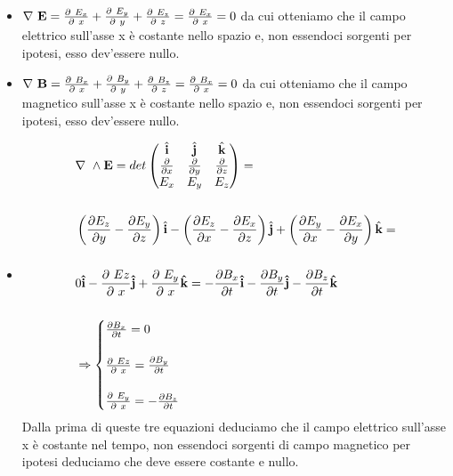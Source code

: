 \documentclass[10pt,a4paper]{article}
\def\d{\ensuremath\partial}
\def\d{\ensuremath\partial\ }
\def\n{\ensuremath\nabla}
\def\n{\ensuremath\nabla\ }
\begin{document}
\begin{itemize}
	\item \(\n\mathbf{E}=\frac{\d E_x}{\d x}+\frac{\d E_y}{\d y}+\frac{\d E_z}{\d z} =\frac{\d E_x}{\d x}=0\)
	da cui otteniamo che il campo elettrico sull'asse x è costante nello spazio e, non essendoci sorgenti per ipotesi, esso dev'essere nullo. 
	\item \(\n\mathbf{B}=\frac{\d B_x}{\d x}+\frac{\d B_y}{\d y}+\frac{\d B_z}{\d z} =\frac{\d B_x}{\d x}=0\)
	da cui otteniamo che il campo magnetico sull'asse x è costante nello spazio e, non essendoci sorgenti per ipotesi, esso dev'essere nullo. 
	\item 
	\begin{align*}
		&\n\wedge\mathbf{E}=det
		\begin{pmatrix}
			\hat{\mathbf{i}}&\hat{\mathbf{j}}&\hat{\mathbf{k}}\\
			\frac{\partial}{\partial x}&\frac{\partial}{\partial y}&\frac{\partial}{\partial z}\\
			E_x&E_y&E_z
		\end{pmatrix}=\\\\
		&\left(\frac{\partial E_z}{\partial y}-\frac{\partial E_y}{\partial z}\right)\hat{\mathbf{i}}
		-\left(\frac{\partial E_z}{\partial x}-\frac{\partial E_x}{\partial z}\right)\hat{\mathbf{j}}
		+\left(\frac{\partial E_y}{\partial x}-\frac{\partial E_x}{\partial y}\right)\hat{\mathbf{k}}=\\\\
		&0\mathbf{\hat{i}}-\frac{\d Ez}{\d x}\mathbf{\hat{j}}+ \frac{\d E_y}{\d x}\mathbf{\hat{k}}=-\frac{\partial B_x}{\partial t}\mathbf{\hat{i}} - \frac{\partial B_y}{\partial t}\mathbf{\hat{j}} -\frac{\partial B_z}{\partial t}\mathbf{\hat{k}}\\\\
		&\Rightarrow
		\begin{cases}
			\frac{\partial B_x}{\partial t} = 0\\\\
			\frac{\d Ez}{\d x} = \frac{\partial B_y}{\partial t}\\\\
			\frac{\d E_y}{\d x} = -\frac{\partial B_z}{\partial t}
		\end{cases}
		\end{align*}
	Dalla prima di queste tre equazioni deduciamo che il campo elettrico sull'asse x è costante nel tempo, non essendoci sorgenti di campo magnetico per ipotesi deduciamo che deve essere costante e nullo. 

\end{itemize}
\end{document}
